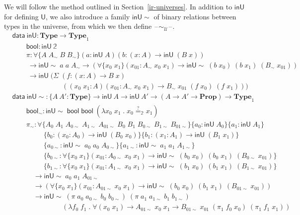\documentclass[autoref]{llncs}
\newcommand{\setoidU}{\mathcal{U}}
\newcommand{\inU}{\mathsf{inU}}
\newcommand{\inUU}{\mathsf{inU{\sim}}}
\newcommand{\mType}{\mathbf{Type}}
\newcommand{\mProp}{\mathbf{Prop}}
\newcommand{\U}{\textsf{U}}
\providecommand\mathbbm{\mathbb}
\newcommand{\blank}{\mathord{\hspace{1pt}\text{--}\hspace{1pt}}}
\begin{document}
We will follow the method outlined in Section~\ref{ir-universes}. In
addition to $\inU$ for defining $\U$, we also introduce a family
$\inUU$ of binary relations between types in the universe, from which we
then define $\blank\sim_{\setoidU}\blank$.
{\small\vspace{-0.2em}
\begin{align*}
  & \textsf{data}\ \inU : \mType \to \mType_1 \\
  & \qquad \textsf{bool} : \inU\ \mathbbm{2} \\
  & \qquad \pi : \forall\{A\;A_\sim\;B\;B_\sim\}(a : \inU\;A)
  (b : (x : A) \to \inU\;(B\;x))\\
  & \qquad\ \to \inUU\;a\;a\;A_\sim \to (\forall\{x_0\;x_1\}(x_{01} : A_\sim\;x_0\;x_1)
  \to \inUU\;(b\;x_0)\;(b\;x_1)\;(B_\sim\;x_{01})) \\
  & \qquad\ \to \inU\;
  (\Sigma\;(f : (x : A) \to B\;x) \\
  &\qquad\qquad\qquad\quad\, ((x_0\;x_1 : A)(x_{01} : A_\sim\;x_0\;x_1) \to B_\sim\;x_{01}\;(f\;x_0)\;(f\;x_1))) \\
  & \textsf{data}\ \inUU : \{A\ A' : \mType\} \to \inU\ A \to \inU\ A' \to (A \to A' \to \mProp) \to \mType_1 \\
  & \qquad \mathsf{bool}_\sim : \inUU\;\textsf{bool}\;\textsf{bool}\;
  (\lambda x_0\;x_1\; .\; x_0 \stackrel{?}{=}_{\mathbbm{2}} x_1) \\
  & \qquad \pi_\sim :
  \forall\{A_0\;A_1\;A_{0\sim}\;A_{1\sim}\;A_{01\sim}\;B_0\;B_1\;B_{0\sim}\;B_{1\sim}\;B_{01\sim}\}
  \{ a_0 : \inU\;A_0 \}\{ a_1 : \inU\;A_1 \}\\
  & \qquad\quad\quad\ \; \{b_0 : (x_0 : A_0) \to \inU\;(B_0\;x_0)\}
  \{b_1 : (x_1 : A_1) \to \inU\;(B_1\;x_1)\}\\
  & \qquad\quad\quad\ \; \{a_{0\sim} : \inUU\;a_0\;a_0\;A_{0\sim}\}
  \{a_{1\sim} : \inUU\;a_1\;a_1\;A_{1\sim}\} \\
  & \qquad\quad\quad\ \; \{ b_{0\sim} : \forall\{x_0\;x_1\}(x_{01} : A_{0\sim}\;x_0\;x_1)
    \to \inUU\;(b_0\;x_0)\;(b_0\;x_1)\;(B_{0\sim}\;x_{01}) \}\\
  & \qquad\quad\quad\ \; \{ b_{1\sim} : \forall\{x_0\;x_1\}(x_{01} : A_{1\sim}\;x_0\;x_1)
    \to \inUU\;(b_1\;x_0)\;(b_1\;x_1)\;(B_{1\sim}\;x_{01}) \}\\
  & \qquad\quad \to \inUU\;a_0\;a_1\;A_{01\sim} \\
    & \qquad\quad \to (\forall\{x_0\;x_1\}(x_{01} : A_{01\sim}\;x_0\;x_1)
      \to \inUU\;(b_0\;x_0)\;(b_1\;x_1)\;(B_{01\sim}\;x_{01})) \\
  & \qquad\quad \to \inUU\;(\pi\;a_0\;a_{0\sim}\;b_0\;b_{0\sim})\;
      (\pi\;a_1\;a_{1\sim}\;b_1\;b_{1\sim}) \\
  & \qquad\qquad\qquad\quad\,(\lambda f_0\;f_1\;.\;\forall(x_0\;x_1)\to A_{01\sim}\;x_0\;x_1
        \to B_{01\sim}\;x_{01}\;(\pi_1\;f_0\;x_0)\;(\pi_1\;f_1\;x_1))
\end{align*}}
\end{document}
